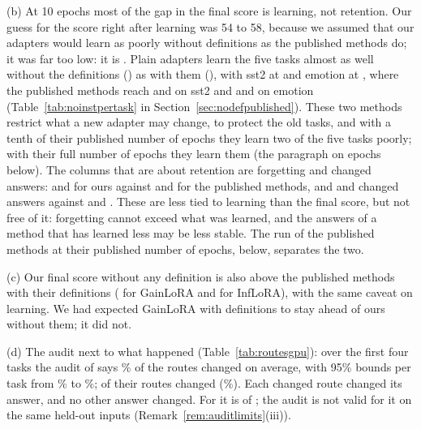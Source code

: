 (b) At 10 epochs most of the gap in the final score is learning, not retention.
Our guess for the score right after learning was 54 to 58, because we assumed that our adapters would learn as poorly without definitions as the published methods do; it was far too low: it is \AudOursRidgeLearned{}.
Plain adapters learn the five tasks almost as well without the definitions (\AudOursAllLearned{}) as with them (\AudWordOriginalAllLearned{}), with sst2 at \AudOursPtLearnedSst{} and emotion at \AudOursPtLearnedEmotion{}, where the published methods reach \AudPubInfloraNoDefPtLearnedSst{} and \AudPubGainloraNoDefPtLearnedSst{} on sst2 and \AudPubInfloraNoDefPtLearnedEmotion{} and \AudPubGainloraNoDefPtLearnedEmotion{} on emotion (Table~\ref{tab:noinstpertask} in Section~\ref{sec:nodefpublished}).
These two methods restrict what a new adapter may change, to protect the old tasks, and with a tenth of their published number of epochs they learn two of the five tasks poorly; with their full number of epochs they learn them (the paragraph on \AudFullEpochs{} epochs below).
The columns that are about retention are forgetting and changed answers: \AudOursRidgeFT{} and \AudOursHandicapFT{} for ours against \AudPubGainloraNoDefFT{} and \AudPubInfloraNoDefFT{} for the published methods, and \AudOursRidgeChanged{} and \AudOursHandicapChanged{} changed answers against \AudPubGainloraNoDefChanged{} and \AudPubInfloraNoDefChanged{}.
These are less tied to learning than the final score, but not free of it: forgetting cannot exceed what was learned, and the answers of a method that has learned less may be less stable. The run of the published methods at their published number of epochs, below, separates the two.

(c) Our final score without any definition is also above the published methods with their definitions (\AudPubGainloraDefAP{} for GainLoRA and \AudPubInfloraDefAP{} for InfLoRA), with the same caveat on learning. We had expected GainLoRA with definitions to stay ahead of ours without them; it did not.

(d) The audit next to what happened (Table~\ref{tab:routesgpu}): over the first four tasks the audit of \recog{} says \AudRouteFiveRidgeFirstFourAuditEst{}\% of the routes changed on average, with 95\% bounds per task from \AudRouteFiveRidgeFirstFourBoundLow{}\% to \AudRouteFiveRidgeFirstFourBoundHigh{}\%; \AudRouteFiveRidgeChanged{} of their \AudRouteFiveRidgeCompared{} routes changed (\AudRouteFiveRidgeChangedShare{}\%). Each changed route changed its answer, and no other answer changed.
For \handicap{} it is \AudRouteFiveHandicapChanged{} of \AudRouteFiveHandicapCompared{}; the audit is not valid for it on the same held-out inputs (Remark~\ref{rem:auditlimits}(iii)).

